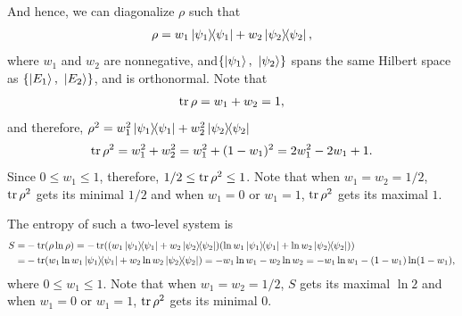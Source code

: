 \documentclass{article}
\newcommand{\set}[1]{\ensuremath{\left\{{#1}\right\}}}
\begin{document}
\begin{enumerate}[1.]
\begin{enumerate}[(i)]
    And hence, we can diagonalize $\rho$ such that
    \begin{align*}
      \rho = w_1\op{\psi_1} + w_2\op{\psi_2},
    \end{align*}
    where $w_1$ and $w_2$ are nonnegative, and$\set{\ket{\psi_1},\ \ket{\psi_2}}$ spans the same Hilbert space as $\set{\ket{E_1},\ \ket{E_2}}$, and is orthonormal. Note that 
    \begin{align*}
      \tr\rho = w_1 + w_2 = 1,
    \end{align*}
    and therefore, $\rho^2 = w_1^2\op{\psi_1} + w_2^2\op{\psi_2}$
    \begin{align*}
      \tr\rho^2 = w_1^2 + w_2^2 = w_1^2 + (1-w_1)^2 = 2 w_1^2 - 2w_1 + 1.
    \end{align*}
    Since $0 \leq w_1 \leq 1$, therefore, $1/2  \leq \tr\rho^2 \leq 1$.
    Note that when $w_1 = w_2 = 1/2$, $\tr \rho^2$ gets its minimal $1/2$ and when $w_1 = 0$ or $w_1 = 1$, $\tr\rho^2$ gets its maximal $1$.
    
    The entropy of such a two-level system is
    \begin{align*}
      S =& - \tr(\rho \ln\rho) = - \tr((w_1\op{\psi_1} + w_2\op{\psi_2})(\ln w_1 \op{\psi_1} + \ln w_2 \op{\psi_2}))
      \\ =& - \tr(w_1\ln w_1 \op{\psi_1} + w_2\ln w_2 \op{\psi_2}) = - w_1\ln w_1 - w_2\ln w_2 = - w_1\ln w_1 - (1-w_1)\ln (1-w_1),
    \end{align*}
    where $0 \leq w_1 \leq 1$. Note that when $w_1 = w_2 = 1/2$, $S$ gets its maximal $\ln 2$ and when $w_1 = 0$ or $w_1 = 1$, $\tr\rho^2$ gets its minimal $0$.
    

\end{enumerate}
\end{enumerate}
\end{document}
